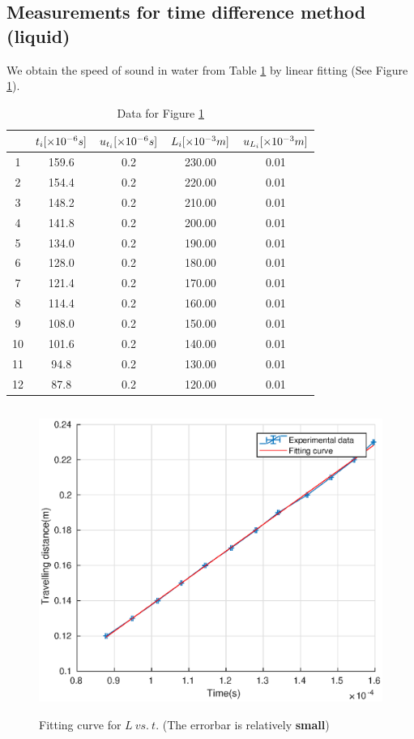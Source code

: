 \subsection{Measurements for time difference method (liquid)}
    We obtain the speed of sound in water from Table \ref{data_tim} by linear fitting (See Figure \ref{lt}).
    \begin{table}[H] \small
        \centering
        \begin{tabular}{|c|c|c|c|c|}
        \hline
            & $t_i[\times10^{-6}s]$ & $u_{t_i}[\times10^{-6}s]$ & $L_i[\times10^{-3}m]$ & $u_{L_i}[\times10^{-3}m]$\\\hline
            1 & 159.6 & 0.2 & 230.00 & 0.01\\\hline
            2 & 154.4 & 0.2 & 220.00 & 0.01\\\hline
            3 & 148.2 & 0.2 & 210.00 & 0.01\\\hline
            4 & 141.8 & 0.2 & 200.00 & 0.01\\\hline
            5 & 134.0 & 0.2 & 190.00 & 0.01\\\hline
            6 & 128.0 & 0.2 & 180.00 & 0.01\\\hline
            7 & 121.4 & 0.2 & 170.00 & 0.01\\\hline
            8 & 114.4 & 0.2 & 160.00 & 0.01\\\hline
            9 & 108.0 & 0.2 & 150.00 & 0.01\\\hline
            10 & 101.6 & 0.2 & 140.00 & 0.01\\\hline
            11 & 94.8 & 0.2 & 130.00 & 0.01\\\hline
            12 & 87.8 & 0.2 & 120.00 & 0.01\\\hline
        \end{tabular}
        \caption{Data for Figure \ref{lt}}\label{data_tim}
    \end{table}
    \begin{figure}[H]
        \centering
        \includegraphics[height=10cm]{images/lt.eps}
        \caption{Fitting curve for $L\ vs.\ t$. (The errorbar is relatively \textbf{small})}\label{lt}
    \end{figure}
